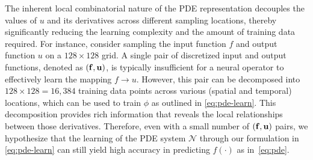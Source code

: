 

The inherent local combinatorial nature of the PDE representation decouples the values of $u$ and its derivatives across different sampling locations, thereby significantly reducing the learning complexity and the amount of training data required.
For instance, consider sampling the input function $f$ and output function $u$ on a $128 \times 128$ grid. A single pair of discretized input and output functions, denoted as $({\bf f}, {\bf u})$, is typically insufficient for a neural operator to effectively learn the mapping $f \rightarrow u$. However, this pair can be decomposed into $128 \times 128 = 16,384$ training data points across various (spatial and temporal) locations, which can be used  to train $\phi$ as outlined in \eqref{eq:pde-learn}. This decomposition provides rich information that reveals the local relationships between those derivatives. Therefore, even with a small number of $({\bf f}, {\bf u})$ pairs, we hypothesize that the learning of the PDE system $\mathcal{N}$ through our formulation in \eqref{eq:pde-learn} can still yield high accuracy in predicting $f(\cdot)$ as in~\eqref{eq:pde}.


